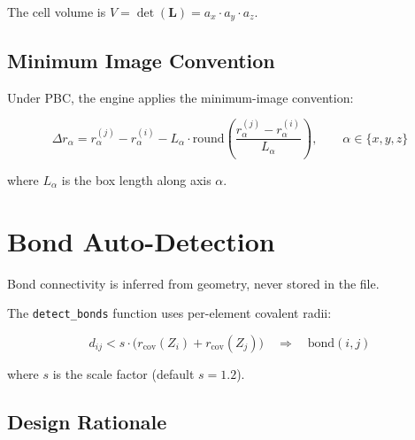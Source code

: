 \documentclass[12pt, a4paper, oneside]{article}
\begin{document}
The cell volume is $V = \det(\mathbf{L}) = a_x \cdot a_y \cdot a_z$.


\subsection{Minimum Image Convention}


Under PBC, the engine applies the minimum-image convention:

\begin{equation}

  \Delta r_\alpha = r_\alpha^{(j)} - r_\alpha^{(i)}

    - L_\alpha \cdot \mathrm{round}\!\left(

      \frac{r_\alpha^{(j)} - r_\alpha^{(i)}}{L_\alpha}

    \right),

  \qquad \alpha \in \{x, y, z\}

  \label{eq:mic}

\end{equation}

where $L_\alpha$ is the box length along axis $\alpha$.



\section{Bond Auto-Detection}

\label{sec:bonds}



Bond connectivity is inferred from geometry, never stored in the file.

The \texttt{detect\_bonds} function uses per-element covalent radii:

\begin{equation}

  d_{ij} < s \cdot \bigl(r_{\text{cov}}(Z_i) + r_{\text{cov}}(Z_j)\bigr)

  \quad \Longrightarrow \quad \text{bond}(i, j)

  \label{eq:bond}

\end{equation}

where $s$ is the scale factor (default $s = 1.2$).


\subsection{Design Rationale}
\end{document}
